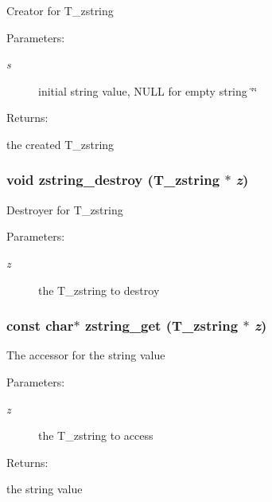 Creator for T\_\-zstring\begin{Desc}
\item[Parameters: ]\par
\begin{description}
\item[{\em 
s}]initial string value, NULL for empty string \char`\"{}\char`\"{} \end{description}
\end{Desc}
\begin{Desc}
\item[Returns: ]\par
the created T\_\-zstring \end{Desc}
\subsubsection{\setlength{\rightskip}{0pt plus 5cm}void zstring\_\-destroy ({\bf T\_\-zstring} $\ast$ {\em z})}\label{group__zstring_a1}


Destroyer for T\_\-zstring\begin{Desc}
\item[Parameters: ]\par
\begin{description}
\item[{\em 
z}]the T\_\-zstring to destroy \end{description}
\end{Desc}
\subsubsection{\setlength{\rightskip}{0pt plus 5cm}const char$\ast$ zstring\_\-get ({\bf T\_\-zstring} $\ast$ {\em z})}\label{group__zstring_a3}


The accessor for the string value\begin{Desc}
\item[Parameters: ]\par
\begin{description}
\item[{\em 
z}]the T\_\-zstring to access \end{description}
\end{Desc}
\begin{Desc}
\item[Returns: ]\par
the string value \end{Desc}
